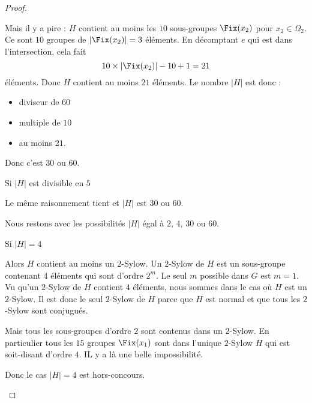 \begin{proof}
\begin{subproof}
                Mais il y a pire : \( H\) contient au moins les \( 10\) sous-groupes \( \Fix(x_2)\) pour \( x_2\in \Omega_2\). Ce sont \( 10\) groupes de \( | \Fix(x_2) |=3\) éléments. En décomptant \( e\) qui est dans l'intersection, cela fait
                \begin{equation}
                    10\times | \Fix(x_2) |-10+1=21
                \end{equation}
                éléments. Donc \( H\) contient au moins \( 21\) éléments. Le nombre \( | H |\) est donc :
                \begin{itemize}
                    \item diviseur de \( 60\)
                    \item multiple de \( 10\)
                    \item au moins \( 21\).
                \end{itemize}
                Donc c'est \( 30\) ou \( 60\).

            \item[Si \( | H |\) est divisible en \( 5\)]

                Le même raisonnement tient et \( | H |\) est \( 30\) ou \( 60\).
                
    \end{subproof}

        Nous restons avec les possibilités \( | H |\) égal à \( 2\), \( 4\), \( 30\) ou \( 60\).

    \begin{subproof}

            \item[Si \( | H | = 4\)]

                Alors \( H\) contient au moins un \( 2\)-Sylow. Un \( 2\)-Sylow de \( H\) est un sous-groupe contenant \( 4\) éléments qui sont d'ordre \( 2^m\). Le seul \( m\) possible dans \( G\) est \( m=1\). Vu qu'un \( 2\)-Sylow de \( H\) contient \( 4\) éléments, nous sommes dans le cas où \( H\) est un \( 2\)-Sylow. Il est donc le seul \( 2\)-Sylow de \( H\) parce que \( H\) est normal et que tous les \( 2\)-Sylow sont conjugués.

                Mais tous les sous-groupes d'ordre \( 2\) sont contenus dans un \( 2\)-Sylow. En particulier tous les \( 15\) groupes \( \Fix(x_1)\) sont dans l'unique \( 2\)-Sylow \( H\) qui est soit-disant d'ordre \( 4\). IL y a là une belle impossibilité.

                Donc le cas \( | H |=4\) est hors-concours.


\end{subproof}
\end{proof}
